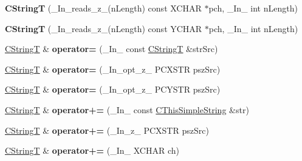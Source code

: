 \begin{DoxyCompactItemize}
\item 
\mbox{\label{class_a_t_l_1_1_c_string_t_aea82ab35f94c9b46e6e511a539283bfe}} 
{\bfseries C\+StringT} (\+\_\+\+In\+\_\+reads\+\_\+z\+\_\+(n\+Length) const X\+C\+H\+AR $\ast$pch, \+\_\+\+In\+\_\+ int n\+Length)
\item 
\mbox{\label{class_a_t_l_1_1_c_string_t_a08ff6ec9f42b9a2ac0b985bd52649e4a}} 
{\bfseries C\+StringT} (\+\_\+\+In\+\_\+reads\+\_\+z\+\_\+(n\+Length) const Y\+C\+H\+AR $\ast$pch, \+\_\+\+In\+\_\+ int n\+Length)
\item 
\mbox{\label{class_a_t_l_1_1_c_string_t_a5bc5949d0ea898e7f5790288a8b12054}} 
\hyperlink{class_a_t_l_1_1_c_string_t}{C\+StringT} \& {\bfseries operator=} (\+\_\+\+In\+\_\+ const \hyperlink{class_a_t_l_1_1_c_string_t}{C\+StringT} \&str\+Src)
\item 
\mbox{\label{class_a_t_l_1_1_c_string_t_ae78ebc5711e663a08443ec9c01ff1955}} 
\hyperlink{class_a_t_l_1_1_c_string_t}{C\+StringT} \& {\bfseries operator=} (\+\_\+\+In\+\_\+opt\+\_\+z\+\_\+ P\+C\+X\+S\+TR psz\+Src)
\item 
\mbox{\label{class_a_t_l_1_1_c_string_t_a45db0ab6a668181b5def8c61f2c39476}} 
\hyperlink{class_a_t_l_1_1_c_string_t}{C\+StringT} \& {\bfseries operator=} (\+\_\+\+In\+\_\+opt\+\_\+z\+\_\+ P\+C\+Y\+S\+TR psz\+Src)
\item 
\mbox{\label{class_a_t_l_1_1_c_string_t_a194db3b4f0526254d26d33bae5283d3b}} 
\hyperlink{class_a_t_l_1_1_c_string_t}{C\+StringT} \& {\bfseries operator+=} (\+\_\+\+In\+\_\+ const \hyperlink{class_a_t_l_1_1_c_simple_string_t}{C\+This\+Simple\+String} \&str)
\item 
\mbox{\label{class_a_t_l_1_1_c_string_t_a6e833d84e3fa11bf5d5664c8f1498862}} 
\hyperlink{class_a_t_l_1_1_c_string_t}{C\+StringT} \& {\bfseries operator+=} (\+\_\+\+In\+\_\+z\+\_\+ P\+C\+X\+S\+TR psz\+Src)
\item 
\mbox{\label{class_a_t_l_1_1_c_string_t_ac8bbb998969baad47e057a405a24f174}} 
\hyperlink{class_a_t_l_1_1_c_string_t}{C\+StringT} \& {\bfseries operator+=} (\+\_\+\+In\+\_\+ X\+C\+H\+AR ch)

\end{DoxyCompactItemize}
